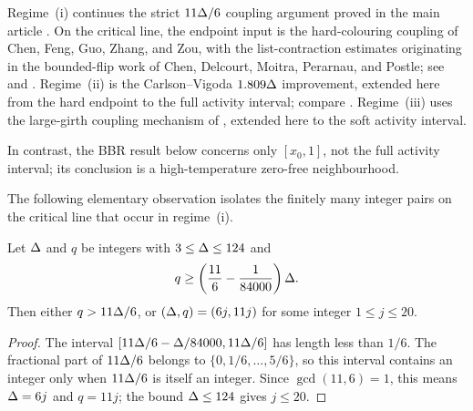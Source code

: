 \begin{remark}
Regime~\textup{(i)} continues the strict \(11\Delta/6\) coupling argument
proved in the main article \cite{ShaoShi2026CI2ZF}.  On the critical line, the endpoint input is the
hard-colouring coupling of Chen, Feng, Guo, Zhang, and Zou, with the
list-contraction estimates originating in the bounded-flip work of Chen,
Delcourt, Moitra, Perarnau, and Postle; see
\cite[Theorem~20 and Proposition~22]{CFFGZZ2024} and
\cite[Section~6 and Appendix~E]{CDMPP2019}.  Regime~\textup{(ii)} is the
Carlson--Vigoda \(1.809\Delta\) improvement, extended here from the hard
endpoint to the full activity interval; compare
\cite{CarlsonVigoda2024}.  Regime~\textup{(iii)} uses the large-girth
coupling mechanism of \cite{CLMM2023}, extended here to the soft activity
interval.

In contrast, the BBR result below concerns only \([x_0,1]\), not the
full activity interval; its conclusion is a high-temperature zero-free
neighbourhood.
\end{remark}

The following elementary observation isolates the finitely many integer
pairs on the critical line that occur in regime~\textup{(i)}.

\begin{lemma}
\label{lem:int-reduction}
Let \(\Delta\) and \(q\) be integers with \(3\le\Delta\le124\) and
\[
  q\ge\left(\frac{11}{6}-\frac1{84000}\right)\Delta.
\]
Then either \(q>11\Delta/6\), or
\((\Delta,q)=(6j,11j)\) for some integer \(1\le j\le20\).
\end{lemma}

\begin{proof}
The interval
\([11\Delta/6-\Delta/84000,11\Delta/6]\) has length less than \(1/6\).
The fractional part of \(11\Delta/6\) belongs to
\(\{0,1/6,\ldots,5/6\}\), so this interval contains an integer only when
\(11\Delta/6\) is itself an integer.  Since \(\gcd(11,6)=1\), this means
\(\Delta=6j\) and \(q=11j\); the bound \(\Delta\le124\) gives \(j\le20\).
\end{proof}

